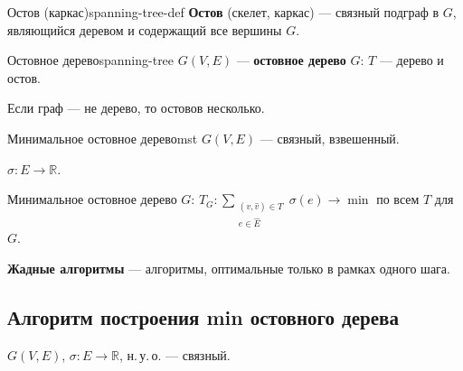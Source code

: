 \begin{defn}{Остов (каркас)}{spanning-tree-def}
\textbf{Остов} (скелет, каркас) --- связный подграф в $G$, являющийся деревом и содержащий все вершины $G$.
\end{defn}

\begin{defn}{Остовное дерево}{spanning-tree}
$G(V, E)$ --- \textbf{остовное дерево} $G$: $T$ --- дерево и остов.

Если граф --- не дерево, то остовов несколько.
\end{defn}


\begin{defn}{Минимальное остовное дерево}{mst}
$G(V, E)$ --- связный, взвешенный.

$\sigma\colon E \to \mathbb{R}$.

Минимальное остовное дерево $G$:
$T_G\colon \displaystyle\sum_{\substack{(v,\hat{v}) \in T \\ e \in \hat{E}}} \sigma(e) \longrightarrow \min$
по всем $T$ для $G$.
\end{defn}


\medskip
\textbf{Жадные алгоритмы} --- алгоритмы, оптимальные только в рамках одного шага.




\subsection*{Алгоритм построения min остовного дерева}

$G(V, E)$, $\sigma\colon E \to \mathbb{R}$, н.\,у.\,о. --- связный.

